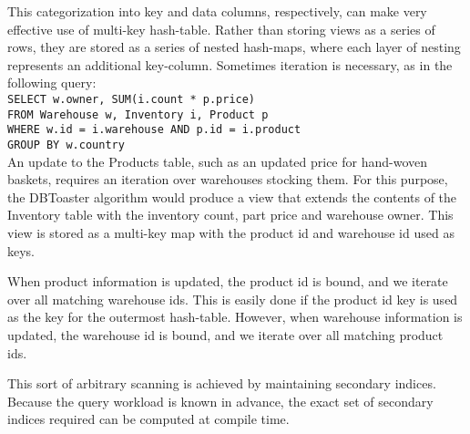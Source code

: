 This categorization into key and data columns, respectively, can make very effective use of multi-key hash-table.  Rather than storing views as a series of rows, they are stored as a series of nested hash-maps, where each layer of nesting represents an additional key-column.  Sometimes iteration is necessary, as in the following query:\texttt{\\
SELECT w.owner, SUM(i.count * p.price)\\
FROM Warehouse w, Inventory i, Product p\\
WHERE w.id = i.warehouse AND p.id = i.product\\
GROUP BY w.country\\
}
An update to the Products table, such as an updated price for hand-woven baskets, requires an iteration over warehouses stocking them.  For this purpose, the DBToaster algorithm would produce a view that extends the contents of the Inventory table with the inventory count, part price and warehouse owner.  This view is stored as a multi-key map with the product id and warehouse id used as keys.

When product information is updated, the product id is bound, and we iterate over all matching warehouse ids.  This is easily done if the product id key is used as the key for the outermost hash-table.  However, when warehouse information is updated, the warehouse id is bound, and we iterate over all matching product ids.  

This sort of arbitrary scanning is achieved by maintaining secondary indices.  Because the query workload is known in advance, the exact set of secondary indices required can be computed at compile time.  


